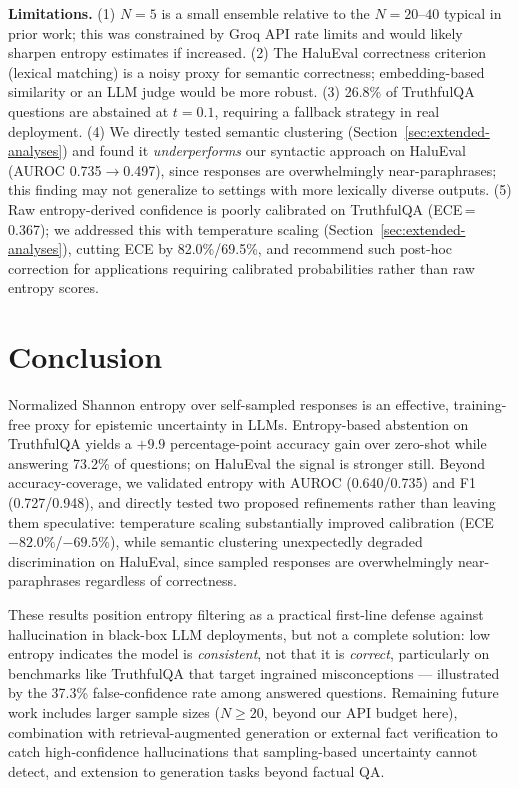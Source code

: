 \documentclass{llncs}
\begin{document}
\textbf{Limitations.} (1) $N{=}5$ is a small ensemble relative to the
$N{=}20$--$40$ typical in prior work; this was constrained by Groq API rate
limits and would likely sharpen entropy estimates if increased. (2) The
HaluEval correctness criterion (lexical matching) is a noisy proxy for
semantic correctness; embedding-based similarity or an LLM judge would be
more robust. (3) 26.8\% of TruthfulQA questions are abstained at $t{=}0.1$,
requiring a fallback strategy in real deployment. (4) We directly tested
semantic clustering (Section~\ref{sec:extended-analyses}) and found it
\emph{underperforms} our syntactic approach on HaluEval (AUROC 0.735$\to$0.497),
since responses are overwhelmingly near-paraphrases; this finding may not
generalize to settings with more lexically diverse outputs. (5) Raw entropy-derived
confidence is poorly calibrated on TruthfulQA (ECE\,=\,0.367); we addressed
this with temperature scaling (Section~\ref{sec:extended-analyses}), cutting
ECE by 82.0\%/69.5\%, and recommend such post-hoc correction for applications
requiring calibrated probabilities rather than raw entropy scores.

\FloatBarrier

\section{Conclusion}
\label{sec:conclusion}

Normalized Shannon entropy over self-sampled responses is an effective,
training-free proxy for epistemic uncertainty in LLMs. Entropy-based
abstention on TruthfulQA yields a $+9.9$ percentage-point accuracy gain over
zero-shot while answering 73.2\% of questions; on HaluEval the signal is
stronger still. Beyond accuracy-coverage, we validated entropy with AUROC
(0.640/0.735) and F1 (0.727/0.948), and directly tested two proposed
refinements rather than leaving them speculative: temperature scaling
substantially improved calibration (ECE $-82.0\%$/$-69.5\%$), while semantic
clustering unexpectedly degraded discrimination on HaluEval, since sampled
responses are overwhelmingly near-paraphrases regardless of correctness.

These results position entropy filtering as a practical first-line defense
against hallucination in black-box LLM deployments, but not a complete
solution: low entropy indicates the model is \emph{consistent}, not that it
is \emph{correct}, particularly on benchmarks like TruthfulQA that target
ingrained misconceptions — illustrated by the 37.3\% false-confidence rate
among answered questions. Remaining future work includes larger sample sizes
($N{\geq}20$, beyond our API budget here), combination with
retrieval-augmented generation or external fact verification to catch
high-confidence hallucinations that sampling-based uncertainty cannot detect,
and extension to generation tasks beyond factual QA.

\FloatBarrier



\end{document}
